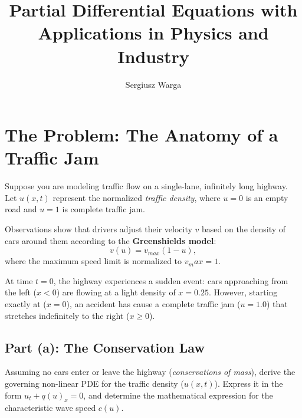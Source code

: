\documentclass[a4paper]{article}
\author{Sergiusz Warga}
\title{Partial Differential Equations with Applications in Physics and Industry}
\begin{document}
\maketitle

\section{The Problem: The Anatomy of a Traffic Jam}

Suppose you are modeling traffic flow on a single-lane, infinitely long highway.
Let $u(x, t)$ represent the normalized \textit{traffic density}, where $u = 0$
is an empty road and $u = 1$ is complete traffic jam.

Observations show that drivers adjust their velocity $v$ based on the density of
cars around them according to the \textbf{Greenshields model}:
\begin{equation}
  v(u) = v_{max}(1 - u),
\end{equation}
where the maximum speed limit is normalized to $v_max = 1$.

At time $t = 0$, the highway experiences a sudden event: cars approaching from
the left ($x < 0$) are flowing at a light density of $x = 0.25$.
However, starting exactly at ($x = 0$), an accident has cause a complete traffic
jam ($u = 1.0$) that stretches indefinitely to the right ($x \geq 0$).

\subsection{Part (a): The Conservation Law}

Assuming no cars enter or leave the highway (\textit{conservations of mass}),
derive the governing non-linear PDE for the traffic density ($u(x, t)$).
Express it in the form $u_t + q(u)_x = 0$, and determine the mathematical
expression for the characteristic wave speed $c(u)$.
\end{document}
